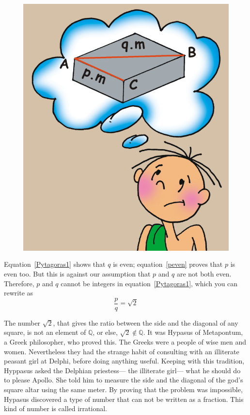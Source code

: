 \documentclass[a4paper,12pt]{book}
\begin{document}
\begin{figure}
	\begin{center}
		\includegraphics[scale=0.5]{fig-sets/apoloa.png}
	\end{center}
\end{figure}
Equation~\ref{Pytagoras1} shows that $q$ is even;
equation~\ref{peven} proves that $p$ is even too. But this is against our
assumption that $p$ and $q$ are not both even. Therefore, $p$ and $q$ cannot be
integers in equation~\ref{Pytagoras1}, which you can rewrite as
$$\frac{p}{q}=\sqrt{2}$$



The number $\sqrt 2$, that gives the ratio
between the side and the diagonal of any square, is not an element of $\mathbb{Q}$,
or else, $\sqrt 2 \notin  \mathbb{Q}$. It was Hypasus of Metapontum, a Greek philosopher,
who proved this. The Greeks were a people of wise men and women. Nevertheless they
had the strange habit of consulting with an illiterate peasant girl at Delphi,
before doing anything useful. Keeping with this tradition, Hyppasus  asked
the Delphian priestess--- the illiterate girl--- what he should do to please Apollo.
She told him to measure  the side and the diagonal of the god's square
altar using the same meter. By proving
that the problem was impossible, Hypasus discovered a type of number that can not be
written as a fraction. This kind of number is called irrational.
\end{document}
